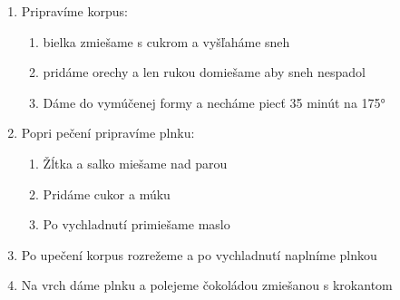 \begin{recipe}

\begin{enumerate}


\item{Pripravíme korpus:}
\begin{enumerate}
\item{bielka zmiešame s cukrom a vyšľaháme sneh}
\item{pridáme orechy a len rukou domiešame aby sneh nespadol}
\item{Dáme do vymúčenej formy a necháme piecť 35 minút na 175°}
\end{enumerate}

\item{Popri pečení pripravíme plnku:}

\begin{enumerate}
\item{Žĺtka a salko miešame nad parou}
\item{Pridáme cukor a múku}
\item{Po vychladnutí primiešame maslo}
\end{enumerate}

\item{Po upečení korpus rozrežeme a po vychladnutí naplníme plnkou}
\item{Na vrch dáme plnku a polejeme čokoládou zmiešanou s krokantom}


\end{enumerate}
\end{recipe}


\clearpage	